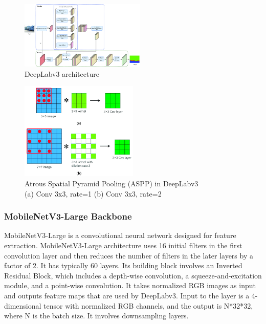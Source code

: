 \begin{figure}[ht]
    \centering
    \includegraphics[width=0.53\textwidth]{Images/deeplabv3.png}
    \caption{DeepLabv3 architecture~\cite{deeplabv3-image}}
    \label{fig:deeplabv3}
\end{figure}

\begin{figure}[ht]
    \centering
    \includegraphics[width=0.5\textwidth]{Images/atrous-convolution.png}
    \caption{Atrous Spatial Pyramid Pooling (ASPP) in DeepLabv3\\ (a) Conv 3x3, rate=1 (b) Conv 3x3, rate=2 \\
    \cite{atrous-convolution-image}}
    \label{fig:atrous-convolution}
\end{figure}


\subsubsection{MobileNetV3-Large Backbone}

MobileNetV3-Large is a convolutional neural network designed for feature extraction. MobileNetV3-Large architecture uses 16 initial filters in the first convolution layer and then reduces the number of filters in the later layers by a factor of 2. It has typically 60 layers. Its building block involves an Inverted Residual Block, which includes a depth-wise convolution, a squeeze-and-excitation module, and a point-wise convolution. It takes normalized RGB images as input and outputs feature maps that are used by DeepLabv3. Input to the layer is a 4-dimensional tensor with normalized RGB channels, and the output is N*32*32, where N is the batch size. It involves downsampling layers.

